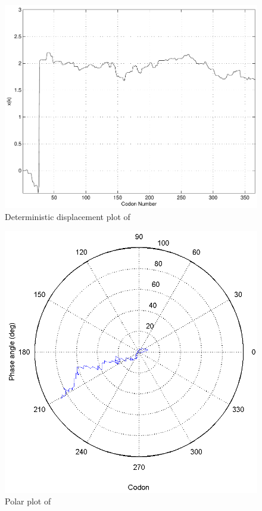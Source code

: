 \documentclass[12pt, draft]{article}
\numberwithin{equation}{section}
\begin{document}
\begin{figure}
  \centering
  \caption{Deterministic displacement plot of~\prfB}
  \label{prfB:deterministic}
  \includegraphics[scale=0.4]{prfB/deterministic}
\end{figure}

\begin{figure}
  \centering
  \caption{Polar plot of \prfB}
  \label{prfB:polar}
  \includegraphics[scale=0.5]{prfB/polar}
\end{figure}
\end{document}

